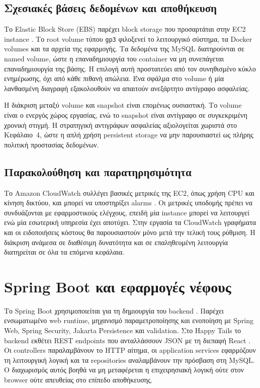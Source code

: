 \subsection{Σχεσιακές βάσεις δεδομένων και αποθήκευση}

Το Elastic Block Store (EBS) παρέχει block storage που προσαρτάται στην EC2
instance \cite{aws2026ebs}. Το root volume τύπου \texttt{gp3} φιλοξενεί το λειτουργικό σύστημα,
τα Docker volumes και τα αρχεία της εφαρμογής. Τα δεδομένα της MySQL
διατηρούνται σε named volume, ώστε η επαναδημιουργία του container να μη
συνεπάγεται επαναδημιουργία της βάσης. Η επιλογή αυτή προστατεύει από τον
συνηθισμένο κύκλο ενημέρωσης, όχι από κάθε πιθανή απώλεια. Ένα σφάλμα στο
volume ή μία λανθασμένη διαγραφή εξακολουθούν να απαιτούν ανεξάρτητο
αντίγραφο ασφαλείας.

Η διάκριση μεταξύ volume και snapshot είναι επομένως ουσιαστική. Το volume
είναι ο ενεργός χώρος εργασίας, ενώ το snapshot είναι αντίγραφο σε
συγκεκριμένη χρονική στιγμή. Η στρατηγική αντιγράφων ασφαλείας αξιολογείται
χωριστά στο Κεφάλαιο~4, ώστε η απλή χρήση persistent storage να μην
παρουσιαστεί ως πλήρης πολιτική προστασίας δεδομένων.

\subsection{Παρακολούθηση και παρατηρησιμότητα}

Το Amazon CloudWatch συλλέγει βασικές μετρικές της EC2, όπως χρήση CPU και
κίνηση δικτύου, και μπορεί να υποστηρίξει alarms \cite{aws2026cloudwatch}. Οι μετρικές υποδομής πρέπει
να συνδυάζονται με εφαρμοστικούς ελέγχους, επειδή μία instance μπορεί να
λειτουργεί ενώ μία εσωτερική υπηρεσία έχει αποτύχει. Στην εργασία τα
CloudWatch γραφήματα και οι ειδοποιήσεις κόστους θα παρουσιαστούν μόνο μετά
την τελική τους ρύθμιση. Η διάκριση ανάμεσα σε διαθέσιμη δυνατότητα και σε
επαληθευμένη λειτουργία διατηρείται σε όλα τα επόμενα κεφάλαια.

\section{Spring Boot και εφαρμογές νέφους}

Το Spring Boot χρησιμοποιείται για τη δημιουργία του backend \cite{spring2026boot}. Παρέχει
ενσωματωμένο web runtime, μηχανισμό παραμετροποίησης και ενοποίηση με Spring
Web, Spring Security, Jakarta Persistence και validation. Στο Happy Tails το
backend εκθέτει REST endpoints που ανταλλάσσουν JSON με τη διεπαφή React
\cite{fielding2000rest,react2026docs}. Οι
controllers παραλαμβάνουν το HTTP αίτημα, οι application services εφαρμόζουν
τη λειτουργική λογική και τα repositories αναλαμβάνουν την πρόσβαση στη
MySQL. Ο διαχωρισμός αυτός βοηθά να μη μεταφέρεται η επιχειρησιακή λογική
ούτε στον browser ούτε απευθείας στο επίπεδο αποθήκευσης.

